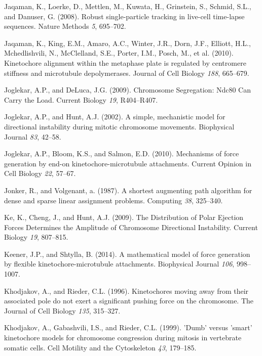 \documentclass[12pt,a4paper,twoside,openright]{book}
\begin{document}
Jaqaman, K., Loerke, D., Mettlen, M., Kuwata, H., Grinstein, S., Schmid,
S.L., and Danuser, G. (2008). Robust single-particle tracking in
live-cell time-lapse sequences. Nature Methods \emph{5}, 695--702.

Jaqaman, K., King, E.M., Amaro, A.C., Winter, J.R., Dorn, J.F., Elliott,
H.L., Mchedlishvili, N., McClelland, S.E., Porter, I.M., Posch, M., et
al. (2010). Kinetochore alignment within the metaphase plate is
regulated by centromere stiffness and microtubule depolymerases. Journal
of Cell Biology \emph{188}, 665--679.

Joglekar, A.P., and DeLuca, J.G. (2009). Chromosome Segregation: Ndc80
Can Carry the Load. Current Biology \emph{19}, R404--R407.

Joglekar, A.P., and Hunt, A.J. (2002). A simple, mechanistic model for
directional instability during mitotic chromosome movements. Biophysical
Journal \emph{83}, 42--58.

Joglekar, A.P., Bloom, K.S., and Salmon, E.D. (2010). Mechanisms of
force generation by end-on kinetochore-microtubule attachments. Current
Opinion in Cell Biology \emph{22}, 57--67.

Jonker, R., and Volgenant, a. (1987). A shortest augmenting path
algorithm for dense and sparse linear assignment problems. Computing
\emph{38}, 325--340.

Ke, K., Cheng, J., and Hunt, A.J. (2009). The Distribution of Polar
Ejection Forces Determines the Amplitude of Chromosome Directional
Instability. Current Biology \emph{19}, 807--815.

Keener, J.P., and Shtylla, B. (2014). A mathematical model of force
generation by flexible kinetochore-microtubule attachments. Biophysical
Journal \emph{106}, 998--1007.

Khodjakov, A., and Rieder, C.L. (1996). Kinetochores moving away from
their associated pole do not exert a significant pushing force on the
chromosome. The Journal of Cell Biology \emph{135}, 315--327.

Khodjakov, A., Gabashvili, I.S., and Rieder, C.L. (1999). 'Dumb' versus
'smart' kinetochore models for chromosome congression during mitosis in
vertebrate somatic cells. Cell Motility and the Cytoskeleton \emph{43},
179--185.
\end{document}
